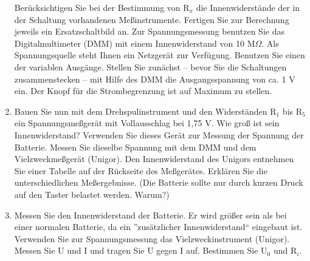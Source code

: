 \documentclass[12pt]{scrartcl}
\begin{document}
\begin{enumerate}
	Berücksichtigen Sie bei 	der Bestimmung 			von $\text{R}_x$ die Innenwiderstände 			der in der Schaltung vorhandenen 				Meßinstrumente. Fertigen Sie zur 				Berechnung jeweils ein Ersatzschaltbild 			an. Zur Spannungsmessung benutzen Sie 			das Digitalmultimeter (DMM) mit einem 			Innenwiderstand von 10 M$\Omega$. Als 			Spannungsquelle steht Ihnen ein 					Netzgerät zur Verfügung. Benutzen Sie 			einen der variablen Ausgänge. Stellen 			Sie zunächst -- bevor Sie die 					Schaltungen 	zusammenstecken -- mit Hilfe 	des DMM die Ausgangsspannung von ca. 			1 V ein. Der Knopf für die 						Strombegrenzung ist auf Maximum zu 				stellen.
	\item
	Bauen Sie nun mit dem Drehspulinstrument 	und den Widerständen $\text{R}_1$ bis 			$\text{R}_5$ ein Spannungsmeßgerät mit 			Vollausschlag bei 1,75 V. Wie groß ist 			sein Innenwiderstand? Verwenden Sie 				dieses Gerät zur Messung der Spannung 			der Batterie. Messen Sie dieselbe 				Spannung mit dem DMM und dem 					Vielzweckmeßgerät (Unigor). Den 					Innenwiderstand des Unigors entnehmen 			Sie einer Tabelle auf der Rückseite des 			Meßgerätes. Erklären Sie die 					unterschiedlichen Meßergebnisse.
	(Die Batterie sollte nur durch 					kurzen Druck auf den Taster belastet 			werden. Warum?)
	\item
	Messen Sie den Innenwiderstand der 				Batterie. Er wird größer sein als bei 			einer normalen Batterie, da ein 					”zusätzlicher Innenwiderstand“ eingebaut 	ist. Verwenden Sie zur Spannungsmessung 			das Vielzweckinstrument (Unigor). Messen 	Sie U und I und tragen Sie U gegen I 			auf. Bestimmen Sie $\text{U}_0$ und 				$\text{R}_i$.
	

\end{enumerate}
\end{document}
